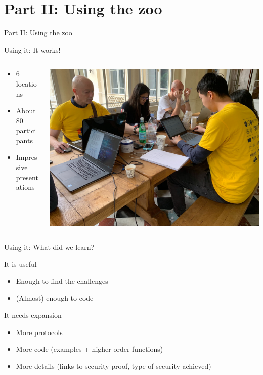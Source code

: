 \documentclass[presentation]{beamer}
\begin{document}
\section{Part II: Using the zoo}
\label{sec:orgd3834a9}
\begin{frame}[label={sec:org6896619}]{Part II: Using the zoo}
\end{frame}
\begin{frame}[label={sec:org4e67905}]{Using it: It works!}
\begin{columns}
\begin{column}{.4\columnwidth}
\begin{itemize}
\item 6 locations
\item About 80 participants
\item Impressive presentations
\end{itemize}
\end{column}
\begin{column}{.6\columnwidth}
\begin{center}
\includegraphics[width=.9\linewidth]{./figs/hackathon.jpg}
\end{center}
\end{column}
\end{columns}
\end{frame}

\begin{frame}[label={sec:org055c9e9}]{Using it: What did we learn?}
\begin{block}{It is useful}
\begin{itemize}
\item Enough to find the challenges
\item (Almost) enough to code
\end{itemize}
\end{block}
\begin{block}{It needs expansion}
\begin{itemize}
\item More protocols
\item More code (examples + higher-order functions)
\item More details (links to security proof, type of security achieved)
\end{itemize}
\end{block}
\end{frame}
\end{document}
